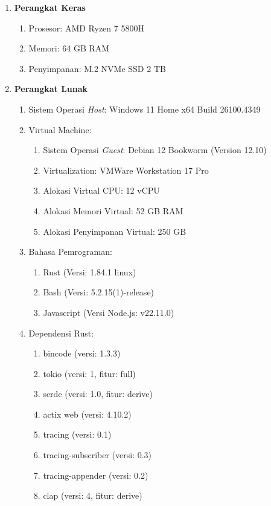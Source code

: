 \begin{enumerate}
  \item \textbf{Perangkat Keras}
    \begin{enumerate}
      \item Prosesor: AMD Ryzen 7 5800H
      \item Memori: 64 GB RAM
      \item Penyimpanan: M.2 NVMe SSD 2 TB
    \end{enumerate}
  \item \textbf{Perangkat Lunak}
    \begin{enumerate}
      \item Sistem Operasi \textit{Host}: Windows 11 Home x64 Build 26100.4349
      \item Virtual Machine:
      \begin{enumerate}
        \item Sistem Operasi \textit{Guest}: Debian 12 Bookworm (Version 12.10)
        \item Virtualization: VMWare Workstation 17 Pro
        \item Alokasi Virtual CPU: 12 vCPU
        \item Alokasi Memori Virtual: 52 GB RAM
        \item Alokasi Penyimpanan Virtual: 250 GB
      \end{enumerate}
      \item Bahasa Pemrograman:
      \begin{enumerate}
        \item Rust (Versi: 1.84.1 linux)
        \item Bash (Versi: 5.2.15(1)-release)
        \item Javascript (Versi Node.js: v22.11.0)
      \end{enumerate}
      \item Dependensi Rust:
      \begin{enumerate}
        \item bincode (versi: 1.3.3)
        \item tokio (versi: 1, fitur: full)
        \item serde (versi: 1.0, fitur: derive)
        \item actix web (versi: 4.10.2)
        \item tracing (versi: 0.1)
        \item tracing-subscriber (versi: 0.3)
        \item tracing-appender (versi: 0.2)
        \item clap (versi: 4, fitur: derive)

\end{enumerate}
\end{enumerate}
\end{enumerate}
